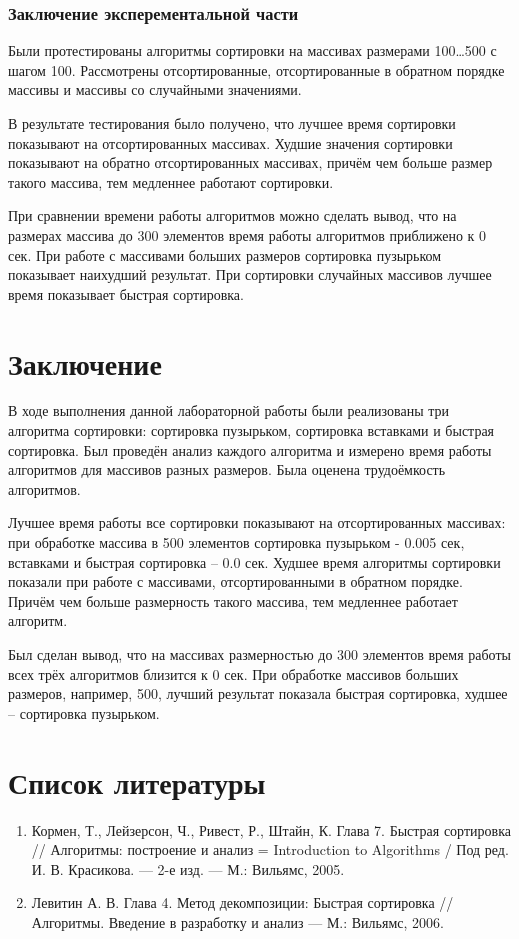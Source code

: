 \documentclass[12pt]{report}
\begin{document}
\subsection{Заключение эксперементальной части}
Были протестированы алгоритмы сортировки на массивах размерами 100…500 с шагом 100. Рассмотрены отсортированные, отсортированные в обратном порядке массивы и массивы со случайными значениями.

В результате тестирования было получено, что лучшее время сортировки показывают на отсортированных массивах. Худшие значения сортировки показывают на обратно отсортированных массивах, причём чем больше размер такого массива, тем медленнее работают сортировки. 

При сравнении времени работы алгоритмов можно сделать вывод, что на размерах массива до 300 элементов время работы алгоритмов приближено к 0 сек. При работе с массивами больших размеров сортировка пузырьком показывает наихудший результат. При сортировки случайных массивов лучшее время показывает быстрая сортировка.

\chapter*{Заключение}
В ходе выполнения данной лабораторной работы были реализованы три алгоритма сортировки: сортировка пузырьком, сортировка вставками и быстрая сортировка. Был проведён анализ каждого алгоритма и измерено время работы алгоритмов для массивов разных размеров. Была оценена трудоёмкость алгоритмов.

Лучшее время работы все сортировки показывают на отсортированных массивах: при обработке массива в 500 элементов сортировка пузырьком - 0.005 сек, вставками и быстрая сортировка – 0.0 сек. Худшее время алгоритмы сортировки показали при работе с массивами, отсортированными в обратном порядке. Причём чем больше размерность такого массива, тем медленнее работает алгоритм.

Был сделан вывод, что на массивах размерностью до 300 элементов время работы всех трёх алгоритмов близится к 0 сек. При обработке массивов больших размеров, например, 500, лучший результат показала быстрая сортировка, худшее – сортировка пузырьком.


\chapter*{Список литературы}
\begin{enumerate}
    \item  Кормен, Т., Лейзерсон, Ч., Ривест, Р., Штайн, К. Глава 7. Быстрая сортировка // Алгоритмы: построение и анализ = Introduction to Algorithms / Под ред. И. В. Красикова. — 2-е изд. — М.: Вильямс, 2005.
    \item Левитин А. В. Глава 4. Метод декомпозиции: Быстрая сортировка // Алгоритмы. Введение в разработку и анализ — М.: Вильямс, 2006. 
\end{enumerate}
\end{document}
